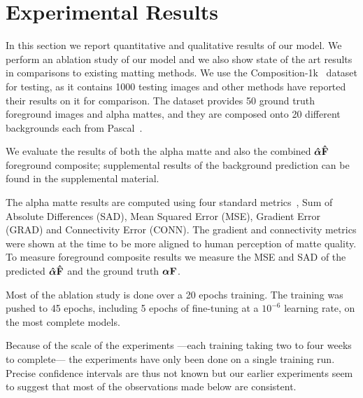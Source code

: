 \documentclass[runningheads]{llncs}
\begin{document}
\section{Experimental Results}
\label{sec:results}


In this section we report quantitative and qualitative results of our model. We perform an ablation study of our model and we also show state of the art results in comparisons to existing matting methods. 
We use the Composition-1k~\cite{DeepImageMatting} dataset for testing, as it contains 1000 testing images and other methods have reported their results on it for comparison. The dataset provides 50 ground truth foreground images and alpha mattes, and they are composed onto 20 different backgrounds each from Pascal~\cite{pascal2012}. 

We evaluate the results of both the alpha matte and also the combined $\bm{\hat{\alpha}}\mathbf{\hat{{F}}}$ foreground composite; supplemental results of the background prediction can be found in the supplemental material. 

The alpha matte results are computed using four standard metrics~\cite{alphamattingcom}, Sum of Absolute Differences (SAD), Mean Squared Error (MSE), Gradient Error (GRAD) and Connectivity Error (CONN). The gradient and connectivity metrics were shown at the time to be more aligned to human perception of matte quality. 
To measure foreground composite results we measure the MSE and SAD of the predicted $\bm{\hat{\alpha}}\mathbf{\hat{{F}}}$ and the ground truth $\bm{{\alpha}}\mathbf{{{F}}}$.

Most of the ablation study is done over a 20 epochs training. The training was pushed to 45 epochs, including 5 epochs of fine-tuning at a $10^{-6}$ learning rate, on the most complete models. 

Because of the scale of the experiments ---each training taking two to four weeks to complete--- the experiments have only been done on a single training run. Precise confidence intervals are thus not known but our earlier experiments seem to suggest that most of the observations made below are consistent.
\end{document}
